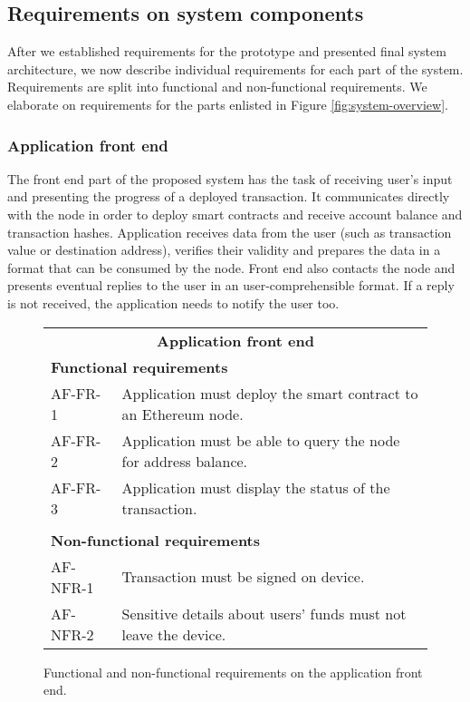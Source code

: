 \subsection{Requirements on system components}\label{sec:component-reqs}

After we established requirements for the prototype and presented final system architecture, we now describe individual requirements for each part of the system. Requirements are split into functional and non-functional requirements. We elaborate on requirements for the parts enlisted in Figure \ref{fig:system-overview}.

\subsubsection{Application front end}\label{sec:app-front-reqs}
The front end part of the proposed system has the task of receiving user's input and presenting the progress of a deployed transaction. It communicates directly with the node in order to deploy smart contracts and receive account balance and transaction hashes. Application receives data from the user (such as transaction value or destination address), verifies their validity and prepares the data in a format that can be consumed by the node. Front end also contacts the node and presents eventual replies to the user in an user-comprehensible format. If a reply is not received, the application needs to notify the user too.

\begin{figure}[ht]
    \begin{tabularx}{\textwidth}{|l X|}
    \hline
        \multicolumn{2}{|c|}{\textbf{Application front end}}\\
        \multicolumn{2}{|l|}{\textbf{Functional requirements}}\\
        AF-FR-1&Application must deploy the smart contract to an Ethereum node.\\
        AF-FR-2&Application must be able to query the node for address balance.\\
        AF-FR-3&Application must display the status of the transaction.\\
        &\\
        \multicolumn{2}{|l|}{\textbf{Non-functional requirements}}\\
        AF-NFR-1&Transaction must be signed on device.\\
        AF-NFR-2&Sensitive details about users' funds must not leave the device.\\
    \hline
    \end{tabularx}
   
    \caption{Functional and non-functional requirements on the application front end.}
    \label{fig:reqa-applicaion}
\end{figure}

